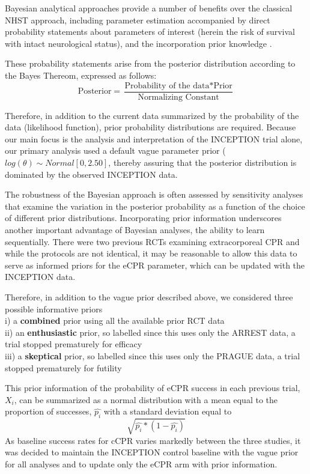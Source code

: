 \documentclass[
  super,
  preprint,
  3p]{elsarticle}
\begin{document}
Bayesian analytical approaches provide a number of benefits over the
classical NHST approach, including parameter estimation accompanied by
direct probability statements about parameters of interest (herein the
risk of survival with intact neurological status), and the incorporation
prior knowledge \citep{BrophyCardio, Zampieri}.

These probability statements arise from the posterior distribution
according to the Bayes Thereom, expressed as follows:
\[ \text{Posterior}  = \frac{\text{Probability of the data} * \text{Prior}}{\text{Normalizing Constant}} \]

Therefore, in addition to the current data summarized by the probability
of the data (likelihood function), prior probability distributions are
required. Because our main focus is the analysis and interpretation of
the INCEPTION trial\citep{CPR2023a} alone, our primary analysis used a
default vague parameter prior (\(log(\theta) \sim Normal [0, 2.50]\),
thereby assuring that the posterior distribution is dominated by the
observed INCEPTION\citep{CPR2023a} data.

The robustness of the Bayesian approach is often assessed by sensitivity
analyses that examine the variation in the posterior probability as a
function of the choice of different prior distributions. Incorporating
prior information underscores another important advantage of Bayesian
analyses, the ability to learn sequentially. There were two previous
RCTs examining extracorporeal CPR\citep{RN6759, RN6751} and while the
protocols are not identical, it may be reasonable to allow this data to
serve as informed priors for the eCPR parameter, which can be updated
with the INCEPTION\citep{CPR2023a} data.

Therefore, in addition to the vague prior described above, we considered
three possible informative priors\\
i) a \textbf{combined} prior using all the available prior RCT
data\citep{RN6751, RN6759}\\
ii) an \textbf{enthusiastic} prior, so labelled since this uses only the
ARREST data, a trial stopped prematurely for efficacy\\
iii) a \textbf{skeptical} prior, so labelled since this uses only the
PRAGUE data, a trial stopped prematurely for futility

This prior information of the probability of eCPR success in each
previous trial, \(X_i\), can be summarized as a normal distribution with
a mean equal to the proportion of successes, \(\hat{p_i}\) with a
standard deviation equal to \[\sqrt{\hat{p_i}*(1-\hat{p_i})}\] As
baseline success rates for cCPR varies markedly between the three
studies, it was decided to maintain the INCEPTION control baseline with
the vague prior for all analyses and to update only the eCPR arm with
prior information.
\end{document}
